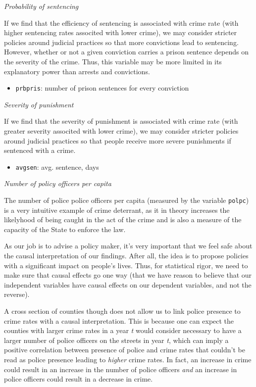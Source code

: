 \documentclass[]{article}
\providecommand{\tightlist}{%
  \setlength{\itemsep}{0pt}\setlength{\parskip}{0pt}}
\begin{document}
\emph{Probability of sentencing}

If we find that the efficiency of sentencing is associated with crime
rate (with higher sentencing rates associted with lower crime), we may
consider stricter policies around judicial practices so that more
convictions lead to sentencing. However, whether or not a given
conviction carries a prison sentence depends on the severity of the
crime. Thus, this variable may be more limited in its explanatory power
than arrests and convictions.

\begin{itemize}
\tightlist
\item
  \texttt{prbpris}: number of prison sentences for every conviction
\end{itemize}

\emph{Severity of punishment}

If we find that the severity of punishment is associated with crime rate
(with greater severity associted with lower crime), we may consider
stricter policies around judicial practices so that people receive more
severe punishments if sentenced with a crime.

\begin{itemize}
\tightlist
\item
  \texttt{avgsen}: avg. sentence, days
\end{itemize}

\emph{Number of policy officers per capita}

The number of police police officers per capita (measured by the
variable \texttt{polpc}) is a very intuitive example of crime deterrant,
as it in theory increases the likelyhood of being caught in the act of
the crime and is also a measure of the capacity of the State to enforce
the law.

As our job is to advise a policy maker, it's very important that we feel
safe about the causal interpretation of our findings. After all, the
idea is to propose policies with a significant impact on people's lives.
Thus, for statistical rigor, we need to make sure that causal effects go
one way (that we have reason to believe that our independent variables
have causal effects on our dependent variables, and not the reverse).

A cross section of counties though does not allow us to link police
presence to crime rates with a causal interpretation. This is because
one can expect the counties with larger crime rates in a year \emph{t}
would consider necessary to have a larger number of police officers on
the streets in year \emph{t}, which can imply a positive correlation
between presence of police and crime rates that couldn't be read as
police presence leading to \emph{higher} crime rates. In fact, an
increase in crime could result in an increase in the number of police
officers \emph{and} an increase in police officers could result in a
decrease in crime.
\end{document}
